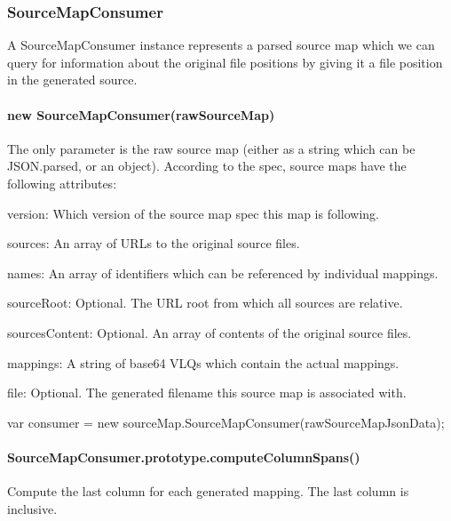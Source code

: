 \subsubsection*{Source\+Map\+Consumer}

A Source\+Map\+Consumer instance represents a parsed source map which we can query for information about the original file positions by giving it a file position in the generated source.

\paragraph*{new Source\+Map\+Consumer(raw\+Source\+Map)}

The only parameter is the raw source map (either as a string which can be {\ttfamily J\+S\+O\+N.\+parse}\textquotesingle{}d, or an object). According to the spec, source maps have the following attributes\+:


\begin{DoxyItemize}
\item {\ttfamily version}\+: Which version of the source map spec this map is following.
\item {\ttfamily sources}\+: An array of U\+R\+Ls to the original source files.
\item {\ttfamily names}\+: An array of identifiers which can be referenced by individual mappings.
\item {\ttfamily source\+Root}\+: Optional. The U\+RL root from which all sources are relative.
\item {\ttfamily sources\+Content}\+: Optional. An array of contents of the original source files.
\item {\ttfamily mappings}\+: A string of base64 V\+L\+Qs which contain the actual mappings.
\item {\ttfamily file}\+: Optional. The generated filename this source map is associated with.
\end{DoxyItemize}


\begin{DoxyCode}
var consumer = new sourceMap.SourceMapConsumer(rawSourceMapJsonData);
\end{DoxyCode}


\paragraph*{Source\+Map\+Consumer.\+prototype.\+compute\+Column\+Spans()}

Compute the last column for each generated mapping. The last column is inclusive.


